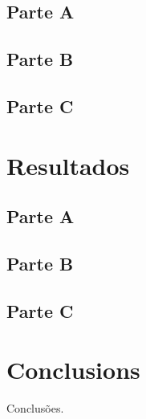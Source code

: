 \documentclass{report}
\begin{document}
\section{Parte A}

\section{Parte B}

\section{Parte C}

\chapter{Resultados}

\section{Parte A}

\section{Parte B}

\section{Parte C}

\chapter{Conclusions}
Conclusões.
\end{document}
